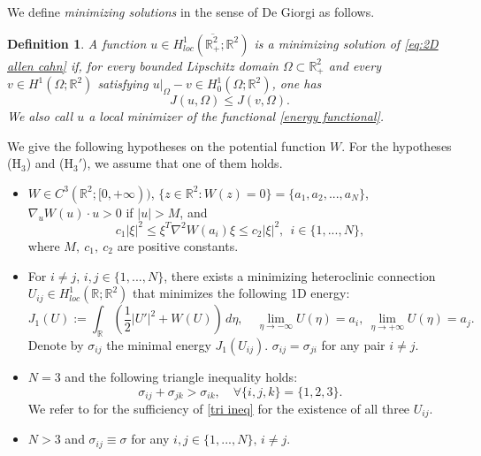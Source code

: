 \documentclass[leqno,11pt]{amsart}
\let\f=\frac
\let\Om=\Omega
\let\ri=\rightarrow
\let\na=\nabla
\newcommand{\beqo}{\begin{equation*}}
\newcommand{\eeqo}{\end{equation*}}
\newtheorem{definition}[theorem]{Definition}
\theoremstyle{remark}
\newcommand{\BR}{\mathbb{R}}
\begin{document}
We define \emph{minimizing solutions} in the sense of De Giorgi as follows.
\begin{definition}\label{def: minimizing sol}
A function $u\in H^1_{loc}(\overline{\BR^2_+};\BR^2)$  is a \emph{minimizing solution} of \eqref{eq:2D allen cahn} if, for every bounded Lipschitz domain $\Om\subset \BR_+^2$ and every $v\in H^1(\Om;\BR^2)$ satisfying $u|_{\Om}-v \in H_0^1(\Om;\BR^2)$, one has 
\begin{equation}
    J(u,\Om)\leq J(v,\Om).
\end{equation}
We also call $u$ a local minimizer of the functional \eqref{energy functional}.
\end{definition}

We give the following hypotheses on the potential function $W$. For the hypotheses ($\mathrm{H}_3$) and ($\mathrm{H}_3'$), we assume that one of them holds.
\begin{itemize}
\itemsep0.5em 
    \item[($\mathrm{H}_1$)] $W\in C^3(\mathbb{R}^2;[0,+\infty))$, $\{z\in\mathbb{R}^2:W(z)=0\}=\{a_1,a_2,...,a_N\}$, $\nabla_uW(u)\cdot u>0$ if $|u|>M$, and 
    \begin{equation*}
        c_1|\xi|^2\leq \xi^T \na^2 W(a_i)\xi\leq c_2|\xi|^2,\ \ i\in\{1,...,N\},
    \end{equation*}
    where $M,\ c_1,\ c_2$ are positive constants.
    \item[($\mathrm{H}_2$)] For $i\neq j$, $i,j\in \{1,...,N\}$, there exists a minimizing heteroclinic connection $U_{ij}\in H^1_{loc}(\BR;\BR^2)$ that minimizes the following 1D energy:
\beqo
J_1(U):=\int_{\BR}\left(\f12|U'|^2+W(U)\right)\,d\eta, \quad \lim\limits_{\eta\ri-\infty}U(\eta)=a_i,\ \lim\limits_{\eta\ri+\infty}U(\eta)=a_j.
\eeqo
Denote by $\sigma_{ij}$ the minimal energy $J_1(U_{ij})$. $\sigma_{ij}=\sigma_{ji}$ for any pair $i\neq j$.
    \item[($\mathrm{H}_3$)]   $N=3$ and the following triangle inequality holds:
\begin{equation}\label{tri ineq}
    \sigma_{ij}+\sigma_{jk}>\sigma_{ik}, \quad \forall \{i,j,k\}=\{1,2,3\}.
\end{equation}
We refer to \cite[Proposition 2.6 \& Proposition 2.12]{afs-book} for the sufficiency of \eqref{tri ineq} for the existence of all three $U_{ij}$.

\item[($\mathrm{H}_3'$)] 
\noindent $N>3$ and $\sigma_{ij}\equiv \sigma$ for any $i, j\in\{1,...,N\},\,i\neq j$. 
\end{itemize}
\end{document}
